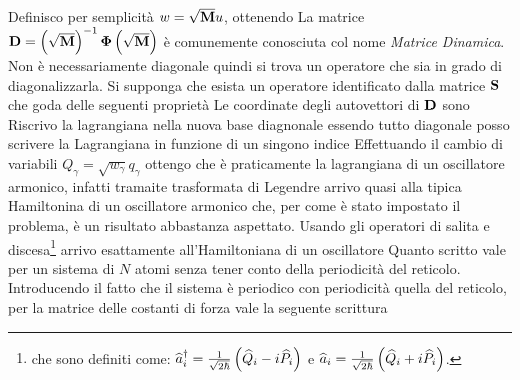 Definisco per semplicità $w = \sqrt{{\it\bf M}} u$, ottenendo
La matrice ${\it\bf D} = \left(\sqrt{{\it\bf M}}\right)^{-1} {\it\bf \Phi} \left(\sqrt{{\it\bf M}}\right)$ è comunemente conosciuta col nome \textit{Matrice Dinamica}. Non è necessariamente diagonale quindi si trova un  operatore che sia in grado di diagonalizzarla. Si supponga che esista un operatore identificato dalla matrice $\it\bf S$ che goda delle seguenti proprietà
Le coordinate degli autovettori di ${\it\bf D}$ sono
Riscrivo la lagrangiana nella nuova base diagnonale
essendo tutto diagonale posso scrivere la Lagrangiana in funzione di un singono indice
Effettuando il cambio di variabili $Q_\gamma = \sqrt{w_\gamma} q_\gamma$ ottengo
che è praticamente la lagrangiana di un oscillatore armonico, infatti tramaite trasformata di Legendre arrivo quasi alla tipica Hamiltonina di un oscillatore armonico
che, per come è stato impostato il problema,  è un risultato abbastanza aspettato. Usando gli operatori di salita e discesa\footnote{che sono definiti come: $\op{a} _i^\dagger =\frac{1}{\sqrt{2\hbar}} \left(\op{Q} _i - i\op{P} _i\right)$ e $\op{a} _i = \frac{1}{\sqrt{2\hbar}} \left(\op{Q} _i + i \op{P} _i\right)  $. }  arrivo esattamente all'Hamiltoniana di un oscillatore
Quanto scritto vale per un sistema di $N$ atomi senza tener conto della periodicità del reticolo. Introducendo il fatto che il sistema è periodico con periodicità quella del reticolo, per la matrice delle costanti di forza vale la seguente scrittura
